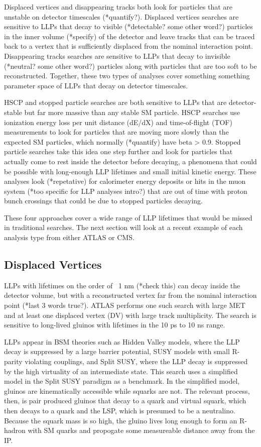 \documentclass[12pt]{article}
\begin{document}
    Displaced vertices and disappearing tracks both look for particles that are unstable on detector timescales (*quantify?). Displaced vertices searches are sensitive to LLPs that decay to visible (*detectable? some other word?) particles in the inner volume (*specify) of the detector and leave tracks that can be traced back to a vertex that is sufficiently displaced from the nominal interaction point. Disappearing tracks searches are sensitive to LLPs that decay to invisible (*neutral? some other word?) particles along with particles that are too soft to be reconstructed. Together, these two types of analyses cover something something parameter space of LLPs that decay on detector timescales.

    HSCP and stopped particle searches are both sensitive to LLPs that are detector-stable but far more massive than any stable SM particle. HSCP searches use ionization energy loss per unit distance (dE/dX) and time-of-flight (TOF) measurements to look for particles that are moving more slowly than the expected SM particles, which normally (*quantify) have beta > 0.9. Stopped particle searches take this idea one step further and look for particles that actually come to rest inside the detector before decaying, a phenomena that could be possible with long-enough LLP lifetimes and small initial kinetic energy. These analyses look (*repetative) for calorimeter energy deposits or hits in the muon system (*too specific for LLP analyses intro?) that are out of time with proton bunch crossings that could be due to stopped particles decaying.

    These four approaches cover a wide range of LLP lifetimes that would be missed in traditional searches. The next section will look  at a recent example of each analysis type from either ATLAS or CMS.
\subsection{Displaced Vertices}
    LLPs with lifetimes on the order of ~1 nm (*check this) can decay inside the detector volume, but with a reconstructed vertex far from the nominal interaction point (*last 3 words true?). ATLAS performs one such search with large MET and at least one displaced vertex (DV) with large track multiplicity. The search is sensitive to long-lived gluinos with lifetimes in the 10 ps to 10 ns range.

    LLPs appear in BSM theories such as Hidden Valley models, where the LLP decay is suppressed by a large barrier potential, SUSY models with small R-parity violating couplings, and Split SUSY, where the LLP decay is suppressed by the high virtuality of an intermediate state. This search uses a simplified model in the Split SUSY paradigm as a benchmark. In the simplified model, gluinos are kinematically accessible while squarks are not. The relevant process, then, is pair produced gluinos that decay to a quark and virtual squark, which then decays to a quark and the LSP, which is presumed to be a neutralino. Because the squark mass is so high, the gluino lives long enough to form an R-hadron with SM quarks and propogate some measureable distance away from the IP. 
\end{document}
